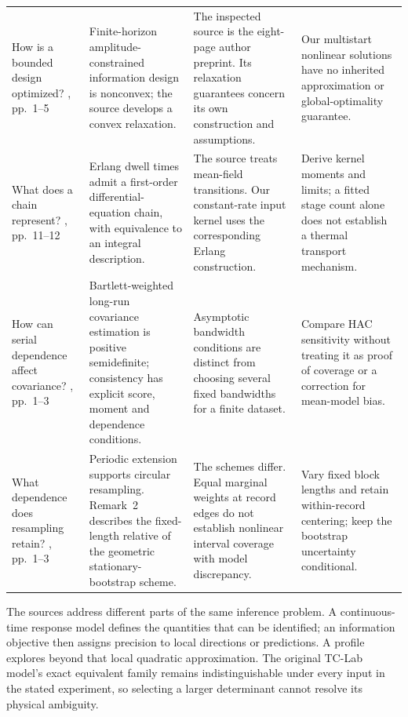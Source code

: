 \documentclass[11pt]{article}
\begin{document}
\begin{longtable}{>{\raggedright\arraybackslash}p{.17\linewidth}>{\raggedright\arraybackslash}p{.25\linewidth}>{\raggedright\arraybackslash}p{.25\linewidth}>{\raggedright\arraybackslash}p{.19\linewidth}}
 How is a bounded design optimized?\newline
 \citet{manchester-2010-input}, pp.~1--5
 & Finite-horizon amplitude-constrained information design is nonconvex; the
 source develops a convex relaxation.
 & The inspected source is the eight-page author preprint. Its relaxation
 guarantees concern its own construction and assumptions.
 & Our multistart nonlinear solutions have no inherited approximation or
 global-optimality guarantee. \\[.6em]

 What does a chain represent?\newline
 \citet{hurtado-2019-generalizations}, pp.~11--12
 & Erlang dwell times admit a first-order differential-equation chain, with
 equivalence to an integral description.
 & The source treats mean-field transitions. Our constant-rate input kernel
 uses the corresponding Erlang construction.
 & Derive kernel moments and limits; a fitted stage count alone does not
 establish a thermal transport mechanism. \\[.6em]

 How can serial dependence affect covariance?\newline
 \citet{newey-1987-simple}, pp.~1--3
 & Bartlett-weighted long-run covariance estimation is positive semidefinite;
 consistency has explicit score, moment and dependence conditions.
 & Asymptotic bandwidth conditions are distinct from choosing several fixed
 bandwidths for a finite dataset.
 & Compare HAC sensitivity without treating it as proof of coverage or a
 correction for mean-model bias. \\[.6em]

 What dependence does resampling retain?\newline
 \citet{politis-1994-stationary}, pp.~1--3
 & Periodic extension supports circular resampling. Remark~2 describes the
 fixed-length relative of the geometric stationary-bootstrap scheme.
 & The schemes differ. Equal marginal weights at record edges do not establish
 nonlinear interval coverage with model discrepancy.
 & Vary fixed block lengths and retain within-record centering; keep the
 bootstrap uncertainty conditional. \\
\end{longtable}
\endgroup

The sources address different parts of the same inference problem. A
continuous-time response model defines the quantities that can be identified;
an information objective then assigns precision to local directions or
predictions. A profile explores beyond that local quadratic approximation.
The original TC-Lab model's exact equivalent family remains indistinguishable
under every input in the stated experiment, so selecting a larger determinant
cannot resolve its physical ambiguity.
\end{document}
